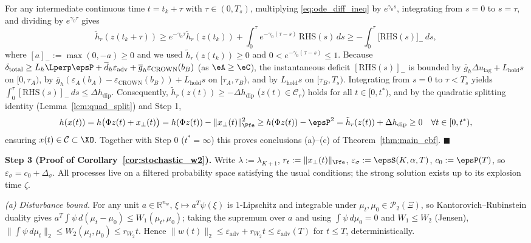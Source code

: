 For any intermediate continuous time \(t = t_k + \tau\) with \(\tau \in (0, T_s)\), multiplying \eqref{eq:ode_diff_ineq} by \(e^{\gamma_0 s}\), integrating from \(s = 0\) to \(s = \tau\), and dividing by \(e^{\gamma_0 \tau}\) gives
\[
\tilde{h}_r(z(t_k + \tau)) \ge e^{-\gamma_0 \tau}\tilde{h}_r(z(t_k)) + \int_0^\tau e^{-\gamma_0(\tau - s)}\,\mathrm{RHS}(s)\,ds \ge -\int_0^\tau \big[\mathrm{RHS}(s)\big]_-\,ds,
\]
where \([a]_- := \max(0, -a) \ge 0\) and we used \(\tilde{h}_r(z(t_k)) \ge 0\) and \(0 < e^{-\gamma_0(\tau - s)} \le 1\). Because \(\delta_{\mathrm{total}} \ge L_h \Lperp\epsP + \overline{d}_h \varepsilon_{\mathrm{adv}} + \overline{g}_h \varepsilon_{\mathrm{CROWN}}(b_B)\) (as \(\eA \ge \eC\)), the instantaneous deficit \([\mathrm{RHS}(s)]_-\) is bounded by \(\overline{g}_h \Delta u_{\mathrm{lag}} + L_{\mathrm{hold}} s\) on \([0, \tau_A)\), by \(\overline{g}_h(\varepsilon_A(b_A) - \varepsilon_{\mathrm{CROWN}}(b_B)) + L_{\mathrm{hold}} s\) on \([\tau_A, \tau_B)\), and by \(L_{\mathrm{hold}} s\) on \([\tau_B, T_s)\). Integrating from \(s = 0\) to \(\tau < T_s\) yields \(\int_0^\tau [\mathrm{RHS}(s)]_-\,ds \le \Delta h_{\mathrm{dip}}\). Consequently, \(\tilde{h}_r(z(t)) \ge -\Delta h_{\mathrm{dip}}\) (\(z(t) \in \mathcal{C}_r\)) holds for all \(t \in [0, t^*)\), and by the quadratic splitting identity (Lemma~\ref{lem:quad_split}) and Step 1,
\[
h(x(t)) = h\big(\Phi z(t) + x_\perp(t)\big) = h(\Phi z(t)) - \|x_\perp(t)\|_{\Pfe}^2 \ge h(\Phi z(t)) - \epsP^2 = \tilde{h}_r(z(t)) + \Delta h_{\mathrm{dip}} \ge 0 \quad \forall t \in [0, t^*),
\]
ensuring \(x(t) \in \mathcal{C} \subset \XO\). Together with Step 0 (\(t^* = \infty\)) this proves conclusions (a)--(c) of Theorem~\ref{thm:main_cbf}. \hfill \(\blacksquare\)

\textbf{Step 3 (Proof of Corollary~\ref{cor:stochastic_w2}).} Write \(\lambda := \lambda_{K+1}\), \(r_t := \|x_\perp(t)\|_{\Pfe}\), \(\varepsilon_\sigma := \epsS(K,\alpha,T)\), \(c_0 := \epsP(T)\), so \(\varepsilon_\sigma = c_0 + \Delta_\sigma\). All processes live on a filtered probability space satisfying the usual conditions; the strong solution exists up to its explosion time \(\zeta\).

\emph{(a) Disturbance bound.} For any unit \(a \in \mathbb{R}^{n_w}\), \(\xi \mapsto a^T\psi(\xi)\) is \(1\)-Lipschitz and integrable under \(\mu_t, \mu_0 \in \mathcal{P}_2(\Xi)\), so Kantorovich--Rubinstein duality gives \(a^T\int\psi\,d(\mu_t - \mu_0) \le W_1(\mu_t,\mu_0)\); taking the supremum over \(a\) and using \(\int\psi\,d\mu_0 = 0\) and \(W_1 \le W_2\) (Jensen), \(\|\int\psi\,d\mu_t\|_2 \le W_2(\mu_t, \mu_0) \le r_{W_2}t\). Hence \(\|w(t)\|_2 \le \varepsilon_{\mathrm{adv}} + r_{W_2}t \le \varepsilon_{\mathrm{adv}}(T)\) for \(t \le T\), deterministically.

